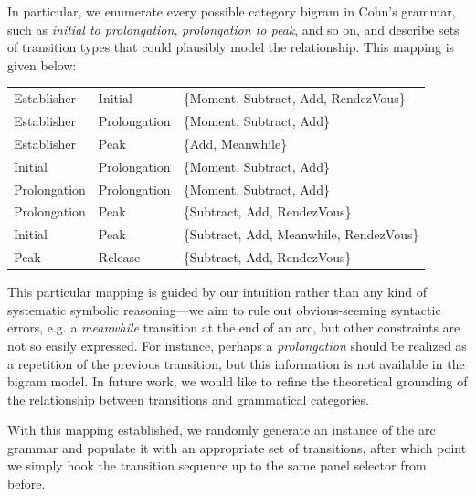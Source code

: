 In particular, we enumerate every possible category bigram in Cohn's grammar,
such as {\em initial to prolongation}, {\em prolongation to peak}, and so
on, and describe sets of transition types that could plausibly model the
relationship. This mapping is given below:



{\scriptsize
\begin{tabular}{lll}
Establisher & Initial & \{Moment, Subtract, Add, RendezVous\} \\
   Establisher & Prolongation & \{Moment, Subtract, Add\} \\
   Establisher & Peak & \{Add, Meanwhile\} \\
   Initial & Prolongation & \{Moment, Subtract, Add\} \\
   Prolongation & Prolongation & \{Moment, Subtract, Add\} \\
   Prolongation & Peak & \{Subtract, Add, RendezVous\} \\
   Initial & Peak & \{Subtract, Add, Meanwhile, RendezVous\} \\
   Peak & Release & \{Subtract, Add, RendezVous\}
\end{tabular}
}


This particular mapping is guided by our intuition rather than any kind of
systematic symbolic reasoning---we aim to rule out obvious-seeming
syntactic errors, e.g. a \emph{meanwhile} transition at the end of an arc, but
other constraints are not so easily expressed. For instance, perhaps a
\emph{prolongation} should be realized as a repetition of the previous
transition, but this information is not available in the bigram model. In
future work, we would like to refine the theoretical grounding of the
relationship between transitions and grammatical categories.

With this mapping established, we randomly generate an instance of the
arc grammar and populate it with an appropriate set of transitions, after
which point we simply hook the transition sequence up to the same panel
selector from before.

